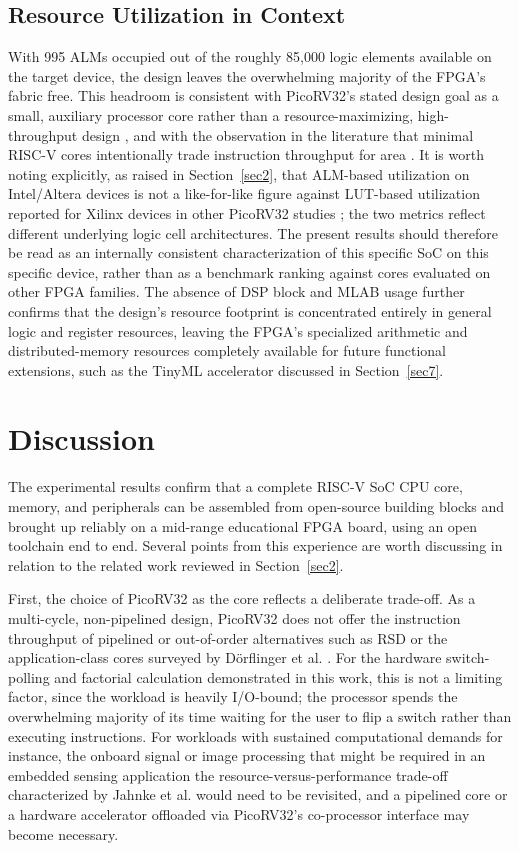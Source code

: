 \documentclass[runningheads]{llncs}
\begin{document}
    \subsection{Resource Utilization in Context}
With 995 ALMs occupied out of the roughly 85,000 logic elements available on the target device, the design leaves the overwhelming majority of the FPGA's fabric free. This headroom is consistent with PicoRV32's stated design goal as a small, auxiliary processor core rather than a resource-maximizing, high-throughput design \cite{wolf2019picorv32}, and with the observation in the literature that minimal RISC-V cores intentionally trade instruction throughput for area \cite{jahnke2023performance}. It is worth noting explicitly, as raised in Section~\ref{sec2}, that ALM-based utilization on Intel/Altera devices is not a like-for-like figure against LUT-based utilization reported for Xilinx devices in other PicoRV32 studies \cite{wolf2019picorv32}; the two metrics reflect different underlying logic cell architectures. The present results should therefore be read as an internally consistent characterization of this specific SoC on this specific device, rather than as a benchmark ranking against cores evaluated on other FPGA families. The absence of DSP block and MLAB usage further confirms that the design's resource footprint is concentrated entirely in general logic and register resources, leaving the FPGA's specialized arithmetic and distributed-memory resources completely available for future functional extensions, such as the TinyML accelerator discussed in Section~\ref{sec7}.

\section{Discussion}\label{sec6}
The experimental results confirm that a complete RISC-V SoC  CPU core, memory, and peripherals  can be assembled from open-source building blocks and brought up reliably on a mid-range educational FPGA board, using an open toolchain end to end. Several points from this experience are worth discussing in relation to the related work reviewed in Section~\ref{sec2}.

First, the choice of PicoRV32 as the core reflects a deliberate trade-off. As a multi-cycle, non-pipelined design, PicoRV32 does not offer the instruction throughput of pipelined or out-of-order alternatives such as RSD \cite{mashimo2019opensource} or the application-class cores surveyed by D{\"o}rflinger et al. \cite{dorflinger2021comparative}. For the hardware switch-polling and factorial calculation demonstrated in this work, this is not a limiting factor, since the workload is heavily I/O-bound; the processor spends the overwhelming majority of its time waiting for the user to flip a switch rather than executing instructions. For workloads with sustained computational demands  for instance, the onboard signal or image processing that might be required in an embedded sensing application  the resource-versus-performance trade-off characterized by Jahnke et al. \cite{jahnke2023performance} would need to be revisited, and a pipelined core or a hardware accelerator offloaded via PicoRV32's co-processor interface may become necessary.
\end{document}
